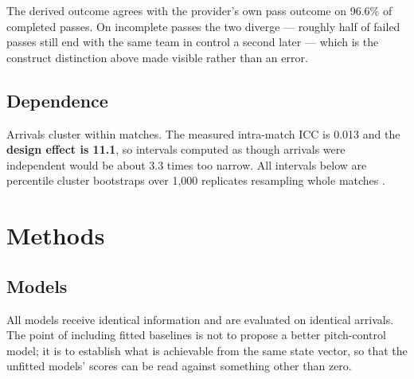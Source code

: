 \documentclass[11pt,a4paper]{article}
\begin{document}
The derived outcome agrees with the provider's own pass outcome on 96.6\% of
completed passes. On incomplete passes the two diverge --- roughly half of failed
passes still end with the same team in control a second later --- which is the
construct distinction above made visible rather than an error.

\subsection{Dependence}

Arrivals cluster within matches. The measured intra-match ICC is 0.013 and the
\textbf{design effect is 11.1}, so intervals computed as though arrivals were
independent would be about 3.3 times too narrow. All intervals below are
percentile cluster bootstraps over 1{,}000 replicates resampling whole matches
\citep{cameron2015cluster, efron1993bootstrap}.


\section{Methods}

\subsection{Models}

All models receive identical information and are evaluated on identical
arrivals. The point of including fitted baselines is not to propose a better
pitch-control model; it is to establish what is achievable from the same state
vector, so that the unfitted models' scores can be read against something other
than zero.
\end{document}
